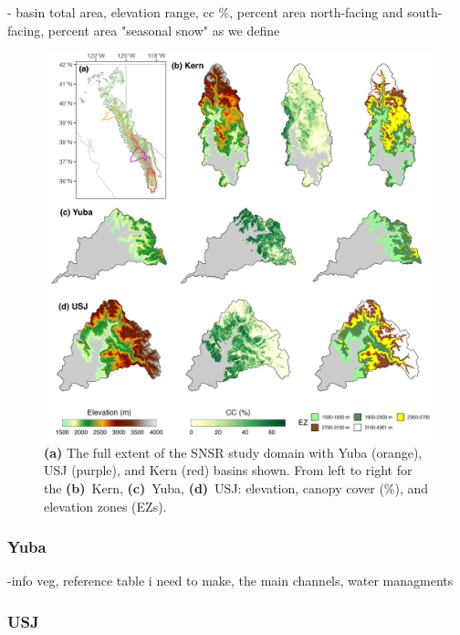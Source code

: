 - basin total area, elevation range, cc \%, percent area north-facing and south-facing, percent area "seasonal snow" as we define

\begin{figure}[t]
\centering
\includegraphics[width=14cm]{figures/ch2_figs/kuy_study_area_v2.png}
\caption{\textbf{(a)} The full extent of the SNSR study domain with Yuba (orange), USJ (purple), and Kern (red) basins shown. From left to right for the \textbf{(b)}~Kern, \textbf{(c)}~Yuba, \textbf{(d)}~USJ: elevation, canopy cover (\%), and elevation zones (EZs).}
\label{kuy_study_area}
\end{figure}
\hypertarget{ch2-sa-1}{\subsubsection{Yuba}\label{ch2-sa-1}}

-info veg, reference table i need to make, the main channels, water managments

\hypertarget{ch2-sa-2}{\subsubsection{USJ}\label{ch2-sa-2}}


